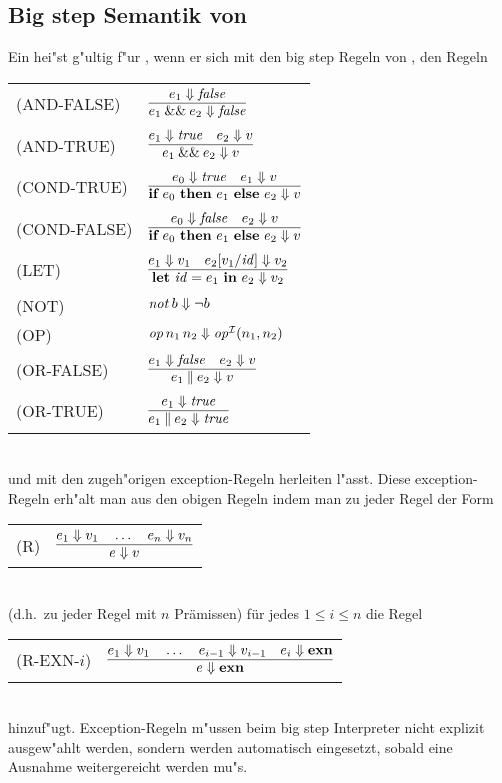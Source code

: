 \subsection{Big step Semantik von \LONE}

Ein  hei"st g"ultig f"ur \LONE, wenn er sich mit den big step Regeln von \LZERO, den Regeln\\[5mm]
  \begin{tabular}{ll}
     \mbox{(AND-FALSE)}   & $\regel{e_1 \eval \false}
                                   {\andalso{e_1}{e_2} \eval \false}$ \\[5mm]
     \mbox{(AND-TRUE)}    & $\regel{e_1 \eval \true \quad e_2 \eval v}
                                   {\andalso{e_1}{e_2} \eval v}$ \\[5mm]
     \mbox{(COND-TRUE)}   & $\regel{e_0 \eval \true \quad e_1 \eval v}
                                   {\bifte{e_0}{e_1}{e_2} \eval v}$ \\[5mm]
     \mbox{(COND-FALSE)}  & $\regel{e_0 \eval \false \quad e_2 \eval v}
                                   {\bifte{e_0}{e_1}{e_2} \eval v}$ \\[5mm]
     \mbox{(LET)}         & $\regel{e_1 \eval v_1 \quad e_2[v_1/\id] \eval v_2}
                                   {\bli{\id}{e_1}{e_2} \eval v_2}$ \\[5mm]
     \mbox{(NOT)}         & ${\text{\it not\/}}\,b \Downarrow \neg b$ \\[3mm]
     \mbox{(OP)}          & ${\text{\it op\/}}\,n_1\,n_2 \Downarrow {\text{\it op\/}}^{{\cal I}}(n_1,n_2)$ \\[3mm]
     \mbox{(OR-FALSE)}    & $\regel{e_1 \eval \false\quad e_2 \eval v}
                                   {\orelse{e_1}{e_2} \eval v}$ \\[5mm]
     \mbox{(OR-TRUE)}     & $\regel{e_1 \eval \true}
                                   {\orelse{e_1}{e_2} \eval \true}$
  \end{tabular}\\[7mm]
und mit den zugeh"origen exception-Regeln herleiten l"asst. Diese exception-Regeln erh"alt man
aus den obigen Regeln indem man zu jeder Regel der Form\\[2mm]
   \begin{tabular}{ll}
     \mbox{(R)} & $\regel{e_1 \eval v_1 \quad \ldots \quad  e_n \eval v_n}
                         {e \eval v}$

   \end{tabular}\\[3mm]
(d.h.\ zu jeder Regel mit $n$ Pr\"amissen) f\"ur jedes $1 \le i \le n$ die Regel \\[3mm]
   \begin{tabular}{ll}
      \mbox{(R-EXN-$i$)} & $\regel{e_1 \eval v_1 \quad \ldots \quad e_{i-1} \eval v_{i-1} \quad e_i \eval \exn}
                                {e \eval \exn}$ \\[5mm]
   \end{tabular}\\[3mm]
hinzuf"ugt. Exception-Regeln m"ussen beim big step Interpreter nicht explizit ausgew"ahlt werden, sondern werden
automatisch eingesetzt, sobald eine Ausnahme weitergereicht werden mu"s.


